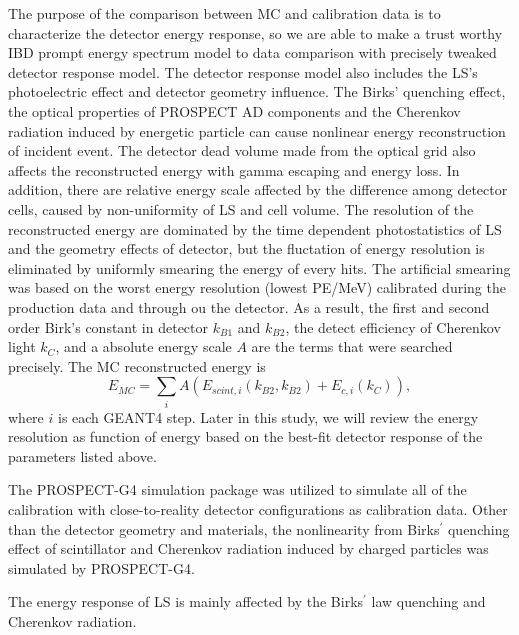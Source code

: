 The purpose of the comparison between MC and calibration data is to characterize the detector energy response, so we are able to make a trust worthy IBD prompt energy spectrum model to data comparison with precisely tweaked detector response model.
The detector response model also includes the LS's photoelectric effect and detector geometry influence. 
The Birks' quenching effect, the optical properties of PROSPECT AD components and the Cherenkov radiation induced by energetic particle can cause nonlinear energy reconstruction of incident event.
The detector dead volume made from the optical grid also affects the reconstructed energy with gamma escaping and energy loss.
In addition, there are relative energy scale affected by the difference among detector cells, caused by non-uniformity of LS and cell volume.
The resolution of the reconstructed energy are dominated by the time dependent photostatistics of LS and the geometry effects of detector, but the fluctation of energy resolution is eliminated by uniformly smearing the energy of every hits.
The artificial smearing was based on the worst energy resolution (lowest PE/MeV) calibrated during the production data and through ou the detector.
As a result, the first and second order Birk’s constant in detector $k_{B1}$ and $k_{B2}$, the detect efficiency of Cherenkov light $k_{C}$, and a absolute energy scale $A$ are the terms that were searched precisely. 
The MC reconstructed energy is  
\begin{equation}
E_{MC} = \sum_i A(E_{scint,i}(k_{B2},k_{B2})+E_{c,i}(k_C)),
\end{equation}
where $i$ is each GEANT4 step.
Later in this study, we will review the energy resolution as function of energy based on the best-fit detector response of the parameters listed above.

The PROSPECT-G4 simulation package was utilized to simulate all of the calibration with close-to-reality detector configurations as calibration data.
Other than the detector geometry and materials, the nonlinearity from Birks$^\prime$ quenching effect of scintillator and Cherenkov radiation induced by charged particles was simulated by PROSPECT-G4.

\label{sec:nonlinear}
The energy response of LS is mainly affected by the Birks$^\prime$ law quenching and Cherenkov radiation. 

